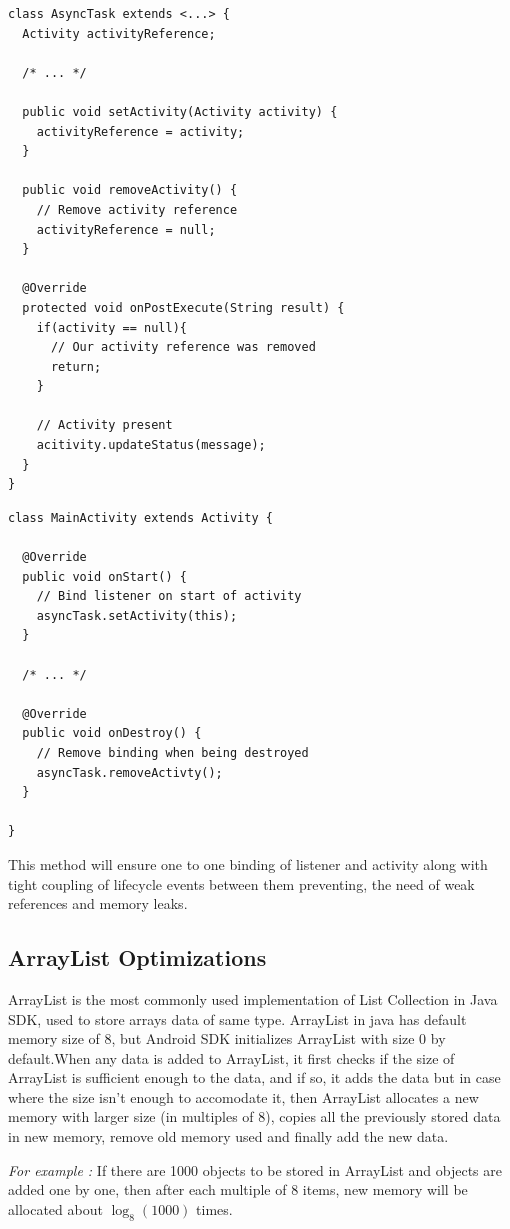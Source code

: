 \documentclass[journal]{IEEEtran}
\begin{document}
\begin{verbatim}
class AsyncTask extends <...> {
  Activity activityReference;

  /* ... */

  public void setActivity(Activity activity) {
    activityReference = activity;
  }
  
  public void removeActivity() {
    // Remove activity reference
    activityReference = null;
  }

  @Override
  protected void onPostExecute(String result) {
    if(activity == null){
      // Our activity reference was removed
      return;
    }

    // Activity present
    acitivity.updateStatus(message);
  }
}
\end{verbatim}
\begin{verbatim}
class MainActivity extends Activity {
  
  @Override
  public void onStart() {
    // Bind listener on start of activity
    asyncTask.setActivity(this);
  }
  
  /* ... */
  
  @Override
  public void onDestroy() {
    // Remove binding when being destroyed
    asyncTask.removeActivty();
  }
  
}
\end{verbatim}

This method will ensure one to one binding of listener and activity along with tight coupling of lifecycle events between them preventing, the need of weak references and memory leaks.

\subsection{ArrayList Optimizations}
ArrayList is the most commonly used implementation of List Collection in Java SDK, used to store arrays data of same type. ArrayList in java has default memory size of 8, but Android SDK initializes ArrayList with size 0 by default.When any data is added to ArrayList, it first checks if the size of ArrayList is sufficient enough to  the data, and if so, it adds the data but in case where the size isn't enough to accomodate it, then ArrayList allocates a new memory with larger size (in multiples of 8), copies all the previously stored data in new memory, remove old memory used and finally add the new data.

\emph{For example :} If there are 1000 objects to be stored in ArrayList and objects are added one by one, then after each multiple of 8 items, new memory will be allocated about $\log_8(1000)$ times.
\end{document}
